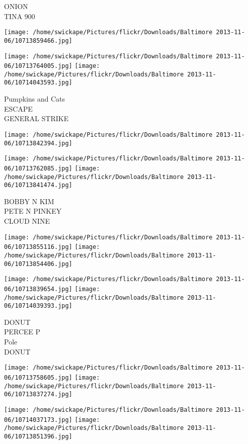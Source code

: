 \documentclass[10pt,letterpaper]{article}
\begin{document}
ONION\\
TINA 900\\
\pagebreak

\texttt{[image: /home/swickape/Pictures/flickr/Downloads/Baltimore 2013-11-06/10713859466.jpg]}

\vspace{0.25in}
\texttt{[image: /home/swickape/Pictures/flickr/Downloads/Baltimore 2013-11-06/10713764005.jpg]}
\texttt{[image: /home/swickape/Pictures/flickr/Downloads/Baltimore 2013-11-06/10714043593.jpg]}

Pumpkins and Cats\\
ESCAPE\\
GENERAL STRIKE\\
\pagebreak

\texttt{[image: /home/swickape/Pictures/flickr/Downloads/Baltimore 2013-11-06/10713842394.jpg]}

\vspace{0.25in}
\texttt{[image: /home/swickape/Pictures/flickr/Downloads/Baltimore 2013-11-06/10713762085.jpg]}
\texttt{[image: /home/swickape/Pictures/flickr/Downloads/Baltimore 2013-11-06/10713841474.jpg]}

BOBBY N KIM\\
PETE N PINKEY\\
CLOUD NINE\\
\pagebreak

\texttt{[image: /home/swickape/Pictures/flickr/Downloads/Baltimore 2013-11-06/10713855116.jpg]}
\texttt{[image: /home/swickape/Pictures/flickr/Downloads/Baltimore 2013-11-06/10713854406.jpg]}

\texttt{[image: /home/swickape/Pictures/flickr/Downloads/Baltimore 2013-11-06/10713839654.jpg]}
\texttt{[image: /home/swickape/Pictures/flickr/Downloads/Baltimore 2013-11-06/10714039393.jpg]}

DONUT\\
PERCEE P\\
Pole\\
DONUT\\
\pagebreak

\texttt{[image: /home/swickape/Pictures/flickr/Downloads/Baltimore 2013-11-06/10713758605.jpg]}
\texttt{[image: /home/swickape/Pictures/flickr/Downloads/Baltimore 2013-11-06/10713837274.jpg]}

\texttt{[image: /home/swickape/Pictures/flickr/Downloads/Baltimore 2013-11-06/10714037173.jpg]}
\texttt{[image: /home/swickape/Pictures/flickr/Downloads/Baltimore 2013-11-06/10713851396.jpg]}
\end{document}
